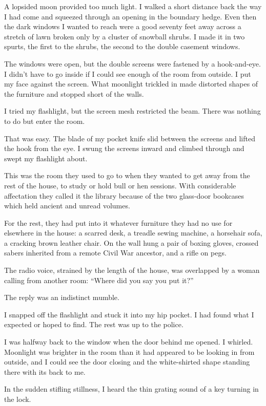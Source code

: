 \documentclass{novel}
\begin{document}
A lopsided moon provided too much light. I walked a short distance back the way I had come and squeezed through an opening in the boundary hedge. Even then the dark windows I wanted to reach were a good seventy feet away across a stretch of lawn broken only by a cluster of snowball shrubs. I made it in two spurts, the first to the shrubs, the second to the double casement windows.

The windows were open, but the double screens were fastened by a hook-and-eye. I didn’t have to go inside if I could see enough of the room from outside. I put my face against the screen. What moonlight trickled in made distorted shapes of the furniture and stopped short of the walls. 

I tried my flashlight, but the screen mesh restricted the beam. There was nothing to do but enter the room.

That was easy. The blade of my pocket knife slid between the screens and lifted the hook from the eye. I swung the screens inward and climbed through and swept my flashlight about.

This was the room they used to go to when they wanted to get away from the rest of the house, to study or hold bull or hen sessions. With considerable affectation they called it the library because of the two glass-door bookcases which held ancient and unread volumes. 

For the rest, they had put into it whatever furniture they had no use for elsewhere in the house: a scarred desk, a treadle sewing machine, a horsehair sofa, a cracking brown leather chair. On the wall hung a pair of boxing gloves, crossed sabers inherited from a remote Civil War ancestor, and a rifle on pegs.

The radio voice, strained by the length of the house, was overlapped by a woman calling from another room: “Where did you say you put it?” 

The reply was an indistinct mumble.

I snapped off the flashlight and stuck it into my hip pocket. I had found what I expected or hoped to find. The rest was up to the police.

I was halfway back to the window when the door behind me opened. I whirled. Moonlight was brighter in the room than it had appeared to be looking in from outside, and I could see the door closing and the white-shirted shape standing there with its back to me. 

In the sudden stifling stillness, I heard the thin grating sound of a key turning in the lock.
\end{document}
